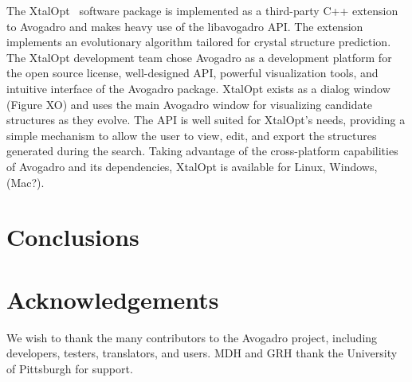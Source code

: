 \documentclass[10pt]{bmc_article}
\newenvironment{bmcformat}{\begin{raggedright}
\baselineskip20pt\sloppy\setboolean{publ}{false}}{\end{raggedright}
\baselineskip20pt\sloppy}
\begin{document}
\begin{bmcformat}
The XtalOpt~\cite{xo1, xo2} software package is implemented as a third-party C++
extension to Avogadro and makes heavy use of the libavogadro API. The extension
implements an evolutionary algorithm tailored for crystal structure prediction.
The XtalOpt development team chose Avogadro as a development platform for the
open source license, well-designed API, powerful visualization tools, and
intuitive interface of the Avogadro package. XtalOpt exists as a dialog window
(Figure XO) and uses the main Avogadro window for visualizing candidate
structures as they evolve. The API is well suited for XtalOpt’s needs,
providing a simple mechanism to allow the user to view, edit, and export the
structures generated during the search. Taking advantage of the cross-platform
capabilities of Avogadro and its dependencies, XtalOpt is available for Linux,
Windows, (Mac?).

\section{Conclusions}

\section{Acknowledgements}

We wish to thank the many contributors to the Avogadro project, including
developers, testers, translators, and users. MDH and GRH thank the University
of Pittsburgh for support.


\newpage
{
   }     %



\end{bmcformat}
\end{document}
